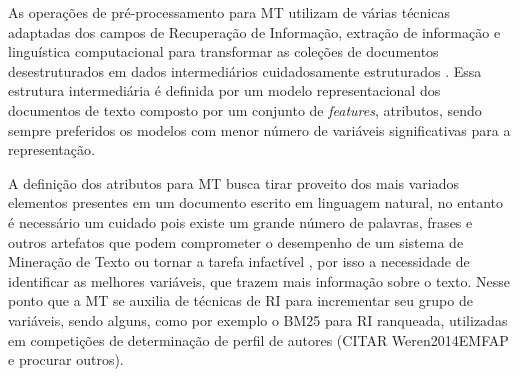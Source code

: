     
    
    As operações de pré-processamento para MT utilizam de várias técnicas adaptadas dos campos de Recuperação de Informação, extração de informação e linguística computacional para transformar as coleções de documentos desestruturados em dados intermediários cuidadosamente estruturados \cite[p.2--3]{Feldman:2006:TMH:1076381}. 
    Essa estrutura intermediária é definida por um modelo representacional dos documentos de texto composto por um conjunto de \textit{features}, atributos, sendo sempre preferidos os modelos com menor número de variáveis significativas para a representação.
    
    
    A definição dos atributos para MT busca tirar proveito dos mais variados elementos presentes em um documento escrito em linguagem natural, no entanto é necessário um cuidado pois existe um grande número de palavras, frases e outros artefatos que podem comprometer o desempenho de um sistema de Mineração de Texto ou tornar a tarefa infactível %
    , por isso a necessidade de identificar as melhores variáveis, que trazem mais informação sobre o texto. 
    Nesse ponto que a MT se auxilia de técnicas de RI para incrementar seu grupo de variáveis, sendo alguns, como por exemplo o BM25 para RI ranqueada, utilizadas em competições de determinação de perfil de autores (CITAR Weren2014EMFAP e procurar outros).
    
